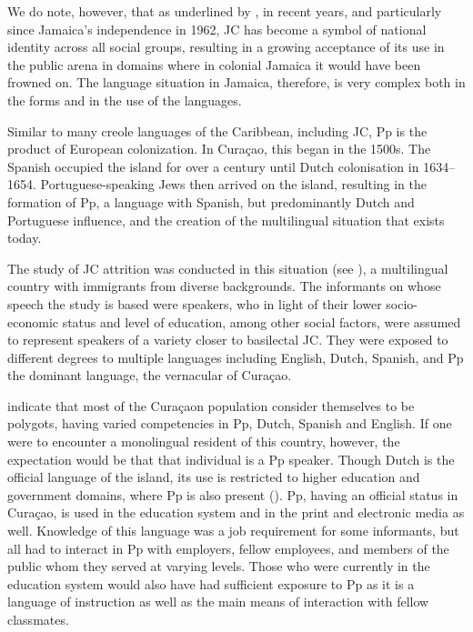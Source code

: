 \documentclass[output=paper,colorlinks,citecolor=brown]{langscibook}
\begin{document}
We do note, however, that as underlined by \citet[231]{DevonishWalters2015}, in recent years, and particularly since Jamaica’s independence in 1962, JC has become a symbol of national identity across all social groups, resulting in a growing acceptance of its use in the public arena in domains where in colonial Jamaica it would have been frowned on. The language situation in Jamaica, therefore, is very complex both in the forms and in the use of the languages.

Similar to many creole languages of the Caribbean, including JC, Pp is the product of European colonization. In Curaçao, this began in the 1500s. The Spanish occupied the island for over a century until Dutch colonisation in 1634--1654. Portuguese-speaking Jews then arrived on the island, resulting in the formation of Pp, a language with Spanish, but predominantly Dutch and Portuguese influence, and the creation of the multilingual situation that exists today.

The study of JC attrition was conducted in this situation (see \citealt{Messam-Johnson2017}), a multilingual country with immigrants from diverse backgrounds. The informants on whose speech the study is based were speakers, who in light of their lower socio-economic status and level of education, among other social factors, were assumed to represent speakers of a variety closer to basilectal JC. They were exposed to different degrees to multiple languages including English, Dutch, Spanish, and Pp the dominant language, the vernacular of Curaçao.

\citet{KouwenbergMurray1994} indicate that most of the Curaçaon population consider themselves to be polygots, having varied competencies in Pp, Dutch, Spanish and English. If one were to encounter a monolingual resident of this country, however, the expectation would be that that individual is a Pp speaker. Though Dutch is the official language of the island, its use is restricted to higher education and government domains, where Pp is also present (\citealt{KouwenbergMurray1994}). Pp, having an official status in Curaçao, is used in the education system and in the print and electronic media as well. Knowledge of this language was a job requirement for some informants, but all had to interact in Pp with employers, fellow employees, and members of the public whom they served at varying levels. Those who were currently in the education system would also have had sufficient exposure to Pp as it is a language of instruction as well as the main means of interaction with fellow classmates.
\end{document}
